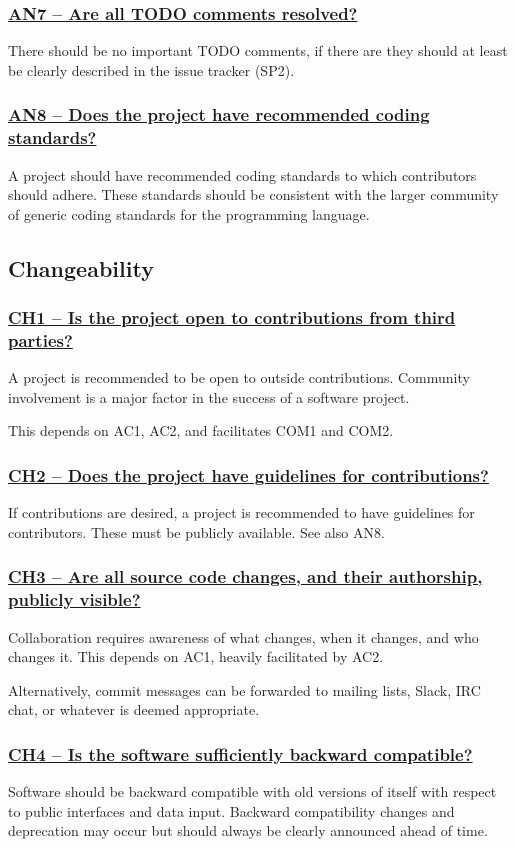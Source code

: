 \documentclass[a4paper,11pt]{article}
\newcommand{\indicator}[1]{\subsubsection*{\underline{#1}}}
\begin{document}
\indicator{AN7 -- Are all TODO comments resolved?}

There should be no important TODO comments, if there are they should at least be
clearly described in the issue tracker (SP2).

\indicator{AN8 -- Does the project have recommended coding standards?}

A project should have recommended coding standards to which contributors
should adhere. These standards should be consistent with the larger community
of generic coding standards for the programming language.

\subsection{Changeability}
%
%
%

\indicator{CH1 -- Is the project open to contributions from third parties?}

A project is recommended to be open to outside contributions. Community
involvement is a major factor in the success of a software project. 

This depends on AC1, AC2, and facilitates COM1 and COM2. 

\indicator{CH2 -- Does the project have guidelines for contributions?}

If contributions are desired, a project is recommended to have guidelines for
contributors. These must be publicly available.
See also AN8.

\indicator{CH3 -- Are all source code changes, and their authorship, publicly visible?} 

Collaboration requires awareness of what changes, when it changes, and who
changes it. This depends on AC1, heavily facilitated by AC2.

Alternatively, commit messages can be forwarded to mailing lists, Slack, IRC chat, or
whatever is deemed appropriate.

\indicator{CH4 -- Is the software sufficiently backward compatible?}

Software should be backward compatible with old versions of itself with respect
to public interfaces and data input. Backward compatibility changes and
deprecation may occur but should always be clearly announced ahead of time.
\end{document}

